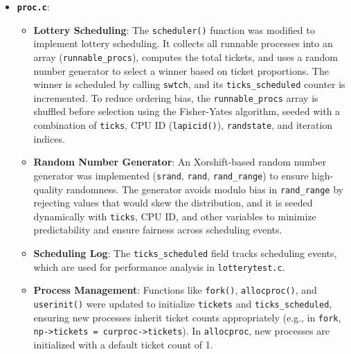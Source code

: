 \documentclass{article}
\begin{document}
\begin{itemize}
    \item \textbf{\texttt{proc.c}}:
        \begin{itemize}
            \item \textbf{Lottery Scheduling}: The \texttt{scheduler()} function was modified to implement lottery scheduling. It collects all runnable processes into an array (\texttt{runnable\_procs}), computes the total tickets, and uses a random number generator to select a winner based on ticket proportions. The winner is scheduled by calling \texttt{swtch}, and its \texttt{ticks\_scheduled} counter is incremented. To reduce ordering bias, the \texttt{runnable\_procs} array is shuffled before selection using the Fisher-Yates algorithm, seeded with a combination of \texttt{ticks}, CPU ID (\texttt{lapicid()}), \texttt{randstate}, and iteration indices.
            \item \textbf{Random Number Generator}: An Xorshift-based random number generator was implemented (\texttt{srand}, \texttt{rand}, \texttt{rand\_range}) to ensure high-quality randomness. The generator avoids modulo bias in \texttt{rand\_range} by rejecting values that would skew the distribution, and it is seeded dynamically with \texttt{ticks}, CPU ID, and other variables to minimize predictability and ensure fairness across scheduling events.
            \item \textbf{Scheduling Log}: The \texttt{ticks\_scheduled} field tracks scheduling events, which are used for performance analysis in \texttt{lotterytest.c}.
            \item \textbf{Process Management}: Functions like \texttt{fork()}, \texttt{allocproc()}, and \texttt{userinit()} were updated to initialize \texttt{tickets} and \texttt{ticks\_scheduled}, ensuring new processes inherit ticket counts appropriately (e.g., in \texttt{fork}, \texttt{np->tickets = curproc->tickets}). In \texttt{allocproc}, new processes are initialized with a default ticket count of 1.
        \end{itemize}
    

\end{itemize}
\end{document}
